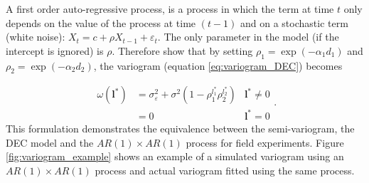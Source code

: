 A first order auto-regressive process, is a process in which the term at time $t$ only depends on the value of the process at time $(t-1)$ and on a stochastic term (white noise): $X_{t} = c + \rho X_{t-1} + \varepsilon_{t}$. 
The only parameter in the model (if the intercept is ignored) is $\rho$. 
Therefore \textcite{cullis_spatial_1991} show that by setting $\rho_1 = \operatorname{exp}(-\alpha_{1}d_{1})$ and $\rho_{2} = \operatorname{exp}(-\alpha_{2}d_{2})$, the variogram (equation \ref{eq:variogram_DEC}) becomes

\begin{equation}
    \begin{aligned}
        \omega\left(\mathbf{l}^{*}\right)
        & = \sigma_{\varepsilon}^{2}+\sigma^{2}\left(1-\rho_{1}^{l_{1}^{*}} \rho_{2}^{l_{2}^{*}}\right) 
        & \mathbf{l}^* \neq 0 \\
        & = 0
        & \mathbf{l}^* = 0 
    \end{aligned}
	\text{.}    
\end{equation}
This formulation demonstrates the equivalence between the semi-variogram, the DEC model and the $AR(1) \times AR(1)$ process for field experiments. Figure \ref{fig:variogram_example} shows an example of a simulated variogram using an $AR(1) \times AR(1)$ process and actual variogram fitted using the same process.

